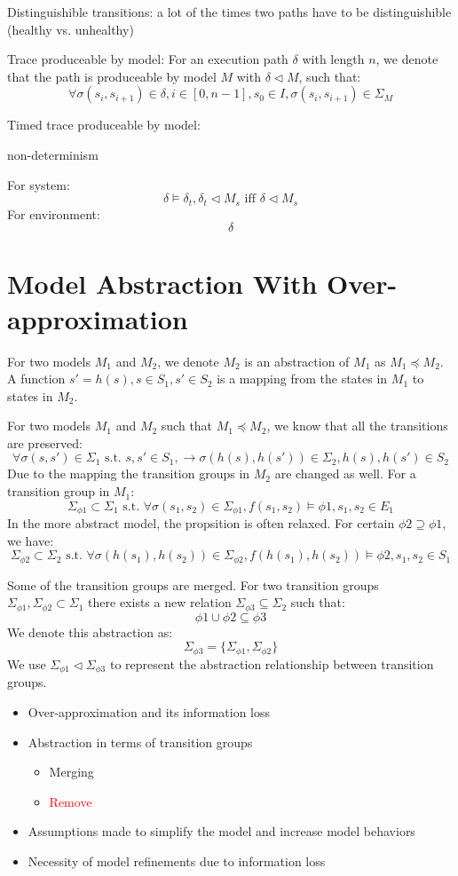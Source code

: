 \documentclass{llncs}
\begin{document}
Distinguishible transitions: a lot of the times two paths have to be distinguishible (healthy vs. unhealthy)


Trace produceable by model: For an execution path $\delta$ with length $n$, we denote that the path is produceable by model $M$ with $\delta\triangleleft M$, such that:
$$\forall \sigma(s_i,s_{i+1})\in \delta,i\in[0,n-1], s_0\in I, \sigma(s_i,s_{i+1})\in\Sigma_M$$

Timed trace produceable by model:


non-determinism

For system:
$$\delta\models\delta_t,\delta_t\triangleleft M_s \text {  iff  } \delta\triangleleft M_s$$
For environment:
$$\delta$$
\section{Model Abstraction With Over-approximation}
For two models $M_1$ and $M_2$, we denote $M_2$ is an abstraction of $M_1$ as $M_1\preceq M_2$. A function $s'=h(s),s\in S_1,s'\in S_2$ is a mapping from the states in $M_1$ to states in $M_2$. 

For two models $M_1$ and $M_2$ such that $M_1\preceq M_2$, we know that all the transitions are preserved:
$$\forall \sigma(s,s') \in\Sigma_1\text{ s.t. }s,s'\in S_1,\rightarrow\sigma(h(s),h(s')) \in\Sigma_2,h(s),h(s')\in S_2$$
Due to the mapping the transition groups in $M_2$ are changed as well. For a transition group in $M_1$:
$$\Sigma_{\phi1}\subset\Sigma_1 \text{ s.t. }\forall\sigma(s_1,s_2)\in\Sigma_{\phi1},f(s_1,s_2)\models\phi1,s_1,s_2\in E_1$$
In the more abstract model, the propsition is often relaxed. For certain $\phi2\supseteq\phi1$, we have:
$$\Sigma_{\phi2}\subset\Sigma_2 \text{ s.t. }\forall\sigma(h(s_1),h(s_2))\in\Sigma_{\phi2},f(h(s_1),h(s_2))\models\phi2,s_1,s_2\in S_1$$


Some of the transition groups are merged. For two transition groups $\Sigma_{\phi1},\Sigma_{\phi2}\subset\Sigma_1$ there exists a new relation $\Sigma_{\phi3}\subseteq\Sigma_2$ such that: $$\phi1\cup\phi2\subseteq\phi3$$
We denote this abstraction as:
$$\Sigma_{\phi3}=\{\Sigma_{\phi1},\Sigma_{\phi2}\}$$
We use $\Sigma_{\phi1}\lhd\Sigma_{\phi3}$ to represent the abstraction relationship between transition groups.
\begin{itemize}
	\item Over-approximation and its information loss
    \item Abstraction in terms of transition groups
    
\begin{itemize}
	\item Merging
    \item \textcolor{red}{Remove}
\end{itemize}
	\item Assumptions made to simplify the model and increase model behaviors
    \item Necessity of model refinements due to information loss
\end{itemize}
\end{document}
